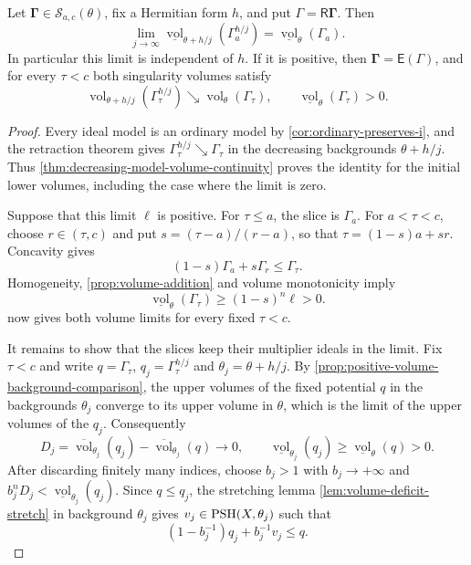 \begin{theorem}\label{thm:positive-volume-system-recovery}
Let $\boldsymbol\Gamma\in\mathscr S_{a,c}(\theta)$, fix a Hermitian form $h$, and put $\Gamma=\mathsf R\boldsymbol\Gamma$. Then
\[
 \lim_{j\to\infty}\underline{\operatorname{vol}}_{\theta+h/j}
       (\Gamma^{h/j}_a)
       =\underline{\operatorname{vol}}_\theta(\Gamma_a).
\]
In particular this limit is independent of $h$. If it is positive, then
$\boldsymbol\Gamma=\mathsf E(\Gamma)$, and for every $\tau<c$ both singularity volumes satisfy
\[
 \operatorname{vol}_{\theta+h/j}(\Gamma^{h/j}_\tau)
       \searrow\operatorname{vol}_\theta(\Gamma_\tau),
 \qquad \underline{\operatorname{vol}}_\theta(\Gamma_\tau)>0.
\]
\end{theorem}
\begin{proof}
Every ideal model is an ordinary model by \cref{cor:ordinary-preserves-i}, and the retraction theorem gives
$\Gamma^{h/j}_\tau\searrow\Gamma_\tau$ in the decreasing backgrounds $\theta+h/j$. Thus \cref{thm:decreasing-model-volume-continuity} proves the identity for the initial lower volumes, including the case where the limit is zero.

Suppose that this limit $\ell$ is positive. For $\tau\leq a$, the slice is $\Gamma_a$. For $a<\tau<c$, choose $r\in(\tau,c)$ and put $s=(\tau-a)/(r-a)$, so that $\tau=(1-s)a+sr$. Concavity gives
\[
 (1-s)\Gamma_a+s\Gamma_r\leq\Gamma_\tau.
\]
Homogeneity, \cref{prop:volume-addition} and volume monotonicity imply
\[
 \underline{\operatorname{vol}}_\theta(\Gamma_\tau)
       \geq(1-s)^n\ell>0.
\]
 now gives both volume limits for every fixed $\tau<c$.

It remains to show that the slices keep their multiplier ideals in the limit. Fix $\tau<c$ and write
$q=\Gamma_\tau$, $q_j=\Gamma^{h/j}_\tau$ and $\theta_j=\theta+h/j$. By \cref{prop:positive-volume-background-comparison}, the upper volumes of the fixed potential $q$ in the backgrounds $\theta_j$ converge to its upper volume in $\theta$, which is the limit of the upper volumes of the $q_j$. Consequently
\[
 D_j=\overline{\operatorname{vol}}_{\theta_j}(q_j)
          -\overline{\operatorname{vol}}_{\theta_j}(q)\longrightarrow0,
 \qquad
 \underline{\operatorname{vol}}_{\theta_j}(q_j)
          \geq\underline{\operatorname{vol}}_\theta(q)>0.
\]
After discarding finitely many indices, choose $b_j>1$ with $b_j\to+\infty$ and
$b_j^nD_j<\underline{\operatorname{vol}}_{\theta_j}(q_j)$.
Since $q\leq q_j$, the stretching lemma \cref{lem:volume-deficit-stretch} in background $\theta_j$ gives $v_j\in\mathrm{PSH}(X,\theta_j)$ such that
\[
 (1-b_j^{-1})q_j+b_j^{-1}v_j\leq q.
\]


\end{proof}
